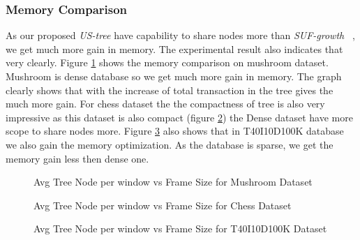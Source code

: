 	\subsubsection{Memory Comparison}
		As our proposed \emph{US-tree} have capability to share nodes more than \emph{SUF-growth} ~\cite{dataset}, we get much more gain in memory. The experimental result also indicates that very clearly. Figure \ref{result:g_m_memory_node} shows the memory comparison on mushroom dataset. Mushroom is dense database so we get  much more gain in memory. The graph clearly shows that with the increase of total transaction in the tree gives the much more gain. For chess dataset the the compactness of tree is also very impressive as this dataset is also compact (figure \ref{result:g_chess_memory_node}) the Dense dataset have more scope to share nodes more. Figure \ref{result:g_t10_memory_node} also shows that in T40I10D100K database we also gain the memory optimization. As the database is sparse, we get the memory gain less then dense one.
			\begin{figure}[h]
			\centering
				
			\caption{Avg Tree Node per window vs Frame Size for Mushroom Dataset ~\cite{dataset}}
			\label{result:g_m_memory_node}
			\end{figure}
			
			\begin{figure}[h]
			\centering
				
			\caption{Avg Tree Node per window vs Frame Size for Chess Dataset ~\cite{dataset}}
			\label{result:g_chess_memory_node}
			\end{figure}
			
			\begin{figure}[h]
				
			\caption{Avg Tree Node per window vs Frame Size for T40I10D100K Dataset ~\cite{dataset}}
			\label{result:g_t10_memory_node}
			\end{figure}
		